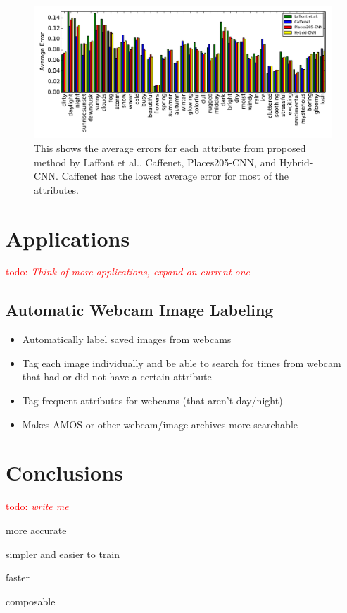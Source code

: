 \documentclass{article}
\newcommand{\todo}[1]{\textcolor{red}{todo: {\em #1}}}
\begin{document}
\begin{figure}[t]
	\centering
		\includegraphics[width=1.0\textwidth]{figs/avg_err_compare.pdf}
		\caption{This shows the average errors for each attribute from proposed method
						 by Laffont et al., Caffenet, Places205-CNN, and Hybrid-CNN.  Caffenet
						 has the lowest average error for most of the attributes.}
		\label{fig:compare}
\end{figure}


\section{Applications}
\todo{Think of more applications, expand on current one}
\subsection{Automatic Webcam Image Labeling}

\begin{itemize}

	\item Automatically label saved images from webcams
	\item Tag each image individually and be able to search for times from
			  webcam that had or did not have a certain attribute
	\item Tag frequent attributes for webcams (that aren't day/night)
	\item Makes AMOS or other webcam/image archives more searchable

\end{itemize}


\section{Conclusions}

\todo{write me}

more accurate

simpler and easier to train

faster

composable



\end{document}
